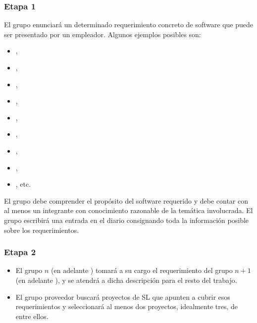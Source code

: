 \subsubsection{Etapa 1} 
El grupo enunciará un determinado requerimiento concreto de software que puede ser presentado por un empleador. Algunos ejemplos posibles son:
\begin{itemize}
	\item {},
	\item  {},
	\item  {},
	\item  {}, 
	\item {},
	\item  {}, 
	\item {},
	\item {},
	\item {}, etc.
\end{itemize}
El grupo debe comprender el propósito del software requerido y debe contar con al menos un integrante con conocimiento razonable de la temática involucrada. El grupo escribirá una entrada en el diario consignando toda la información posible sobre los requerimientos. 

\subsubsection{Etapa 2} 

\begin{itemize}
	\item El grupo $n$ (en adelante ) tomará a su cargo el requerimiento del grupo $n+1$ (en adelante ), y se atendrá a dicha descripción para el resto del trabajo. 
	\item El grupo proveedor buscará proyectos de SL que apunten a cubrir esos requerimientos y seleccionará al menos dos proyectos, idealmente tres, de entre ellos.
\end{itemize}

